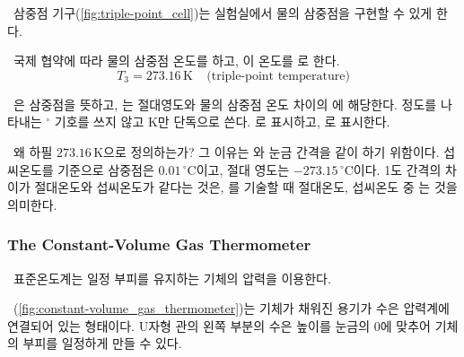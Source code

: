 \triplepointcell
{}%
\ 삼중점 기구(\autoref{fig:triple-point_cell})는 실험실에서 물의 삼중점을 구현할 수 있게 한다.
\clearpage



\ 국제 협약에 따라 물의 삼중점 온도를 하고,
이 온도를 로 한다.
\begin{equation} T_{3} = 273.16\,\mathrm{K} ~~~~~ \text{(triple-point temperature)} \end{equation}

\ 은 삼중점을 뜻하고, 는 절대영도와 물의 삼중점 온도 차이의
에 해당한다. 정도를 나타내는 $^\circ$ 기호를 쓰지 않고 $\mathrm{K}$만 단독으로 쓴다.
로 표시하고, 로 표시한다.

\begin{sssbox}
\ 왜 하필 $273.16\,\mathrm{K}$으로 정의하는가? 그 이유는 와 눈금 간격을 같이 하기 위함이다.
섭씨온도를 기준으로 삼중점은 $0.01\,^\circ\mathrm{C}$이고, 절대 영도는 $-273.15\,^\circ\mathrm{C}$이다.
1도 간격의 차이가 절대온도와 섭씨온도가 같다는 것은,
를 기술할 때 절대온도, 섭씨온도 중 는 것을 의미한다.
\end{sssbox}

\subsubsection{The Constant-Volume Gas Thermometer}
%
\ 표준온도계는 일정 부피를 유지하는 기체의 압력을 이용한다.

\constantvolumegasthermometer
{}%
\ (\autoref{fig:constant-volume_gas_thermometer})는 기체가 채워진 용기가
수은 압력계에 연결되어 있는 형태이다.
 U자형 관의 왼쪽 부분의 수은 높이를 눈금의 $0$에 맞추어
기체의 부피를 일정하게 만들 수 있다.

